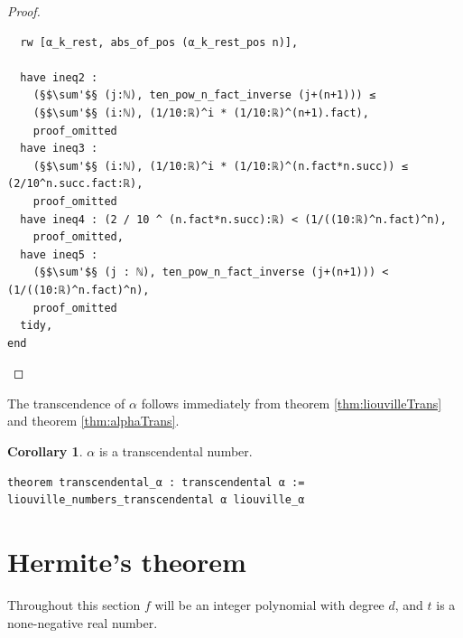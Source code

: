 \documentclass{report}
\theoremstyle{definition}
\newtheorem{lemma}{Lemma}[section]
\newtheorem{corollary}{Corollary}[section]
\begin{document}
\begin{proof}
\begin{verbatim}
  rw [α_k_rest, abs_of_pos (α_k_rest_pos n)],

  have ineq2 : 
    (§$\sum'$§ (j:ℕ), ten_pow_n_fact_inverse (j+(n+1))) ≤ 
    (§$\sum'$§ (i:ℕ), (1/10:ℝ)^i * (1/10:ℝ)^(n+1).fact),
    proof_omitted
  have ineq3 : 
    (§$\sum'$§ (i:ℕ), (1/10:ℝ)^i * (1/10:ℝ)^(n.fact*n.succ)) ≤ (2/10^n.succ.fact:ℝ),
    proof_omitted
  have ineq4 : (2 / 10 ^ (n.fact*n.succ):ℝ) < (1/((10:ℝ)^n.fact)^n),
    proof_omitted,
  have ineq5 : 
    (§$\sum'$§ (j : ℕ), ten_pow_n_fact_inverse (j+(n+1))) < (1/((10:ℝ)^n.fact)^n),
    proof_omitted
  tidy,
end
\end{verbatim}
\end{proof}

The transcendence of $\alpha$ follows immediately from theorem \ref{thm:liouvilleTrans} and theorem \ref{thm:alphaTrans}.
\begin{corollary}
$\alpha$ is a transcendental number.

\begin{verbatim}
theorem transcendental_α : transcendental α := liouville_numbers_transcendental α liouville_α 
\end{verbatim}
\end{corollary}

\section{Hermite's theorem}\label{fmlsn:e}
Throughout this section $f$ will be an integer polynomial with degree $d$, and $t$ is a none-negative real number.


\end{document}
